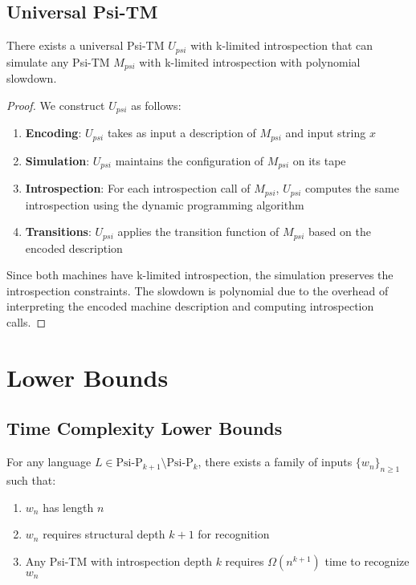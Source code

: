 \subsection{Universal Psi-TM}

\begin{theorem}
There exists a universal Psi-TM $U_{psi}$ with k-limited introspection that can simulate any Psi-TM $M_{psi}$ with k-limited introspection with polynomial slowdown.
\end{theorem}

\begin{proof}
We construct $U_{psi}$ as follows:

\begin{enumerate}
\item \textbf{Encoding}: $U_{psi}$ takes as input a description of $M_{psi}$ and input string $x$
\item \textbf{Simulation}: $U_{psi}$ maintains the configuration of $M_{psi}$ on its tape
\item \textbf{Introspection}: For each introspection call of $M_{psi}$, $U_{psi}$ computes the same introspection using the dynamic programming algorithm
\item \textbf{Transitions}: $U_{psi}$ applies the transition function of $M_{psi}$ based on the encoded description
\end{enumerate}

Since both machines have k-limited introspection, the simulation preserves the introspection constraints. The slowdown is polynomial due to the overhead of interpreting the encoded machine description and computing introspection calls.
\end{proof}

\section{Lower Bounds}

\subsection{Time Complexity Lower Bounds}

\begin{theorem}
\label{thm:structural-depth-lower-bound-2}
For any language $L \in \text{Psi-P}_{k+1} \setminus \text{Psi-P}_k$, there exists a family of inputs $\{w_n\}_{n \geq 1}$ such that:
\begin{enumerate}
\item $w_n$ has length $n$
\item $w_n$ requires structural depth $k+1$ for recognition
\item Any Psi-TM with introspection depth $k$ requires $\Omega(n^{k+1})$ time to recognize $w_n$
\end{enumerate}
\end{theorem}

